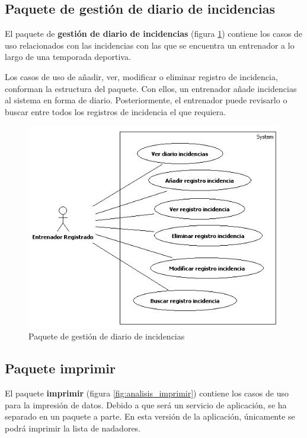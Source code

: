 	
	\subsection{Paquete de gestión de diario de incidencias} %
		\label{sub:paquete_de_gestion_de_diario_de_incidencias}
	
		El paquete de {\bf gestión de diario de incidencias} (figura \ref{fig:analisis_gestion_incidencias}) contiene los casos de uso relacionados con las incidencias con las que se encuentra un entrenador a lo largo de una temporada deportiva.
		
		Los casos de uso de añadir, ver, modificar o eliminar registro de incidencia, conforman la estructura del paquete. Con ellos, un entrenador añade incidencias al sistema en forma de diario. Posteriormente, el entrenador puede revisarlo o buscar entre todos los registros de incidencia el que requiera.
		
		\begin{figure}[H]
		  \centering
		    \includegraphics[width=13cm]{./eps/casos_uso/gestion_incidencias.eps}
		  \caption{Paquete de gestión de diario de incidencias}
		  \label{fig:analisis_gestion_incidencias}
		\end{figure}
		
	
	\subsection{Paquete imprimir} %
		\label{sub:paquete_imprimir}
		El paquete {\bf imprimir} (figura \ref{fig:analisis_imprimir}) contiene los casos de uso para la impresión de datos. Debido a que será un servicio de aplicación, se ha separado en un paquete a parte. En esta versión de la aplicación, únicamente se podrá imprimir la lista de nadadores.
		
